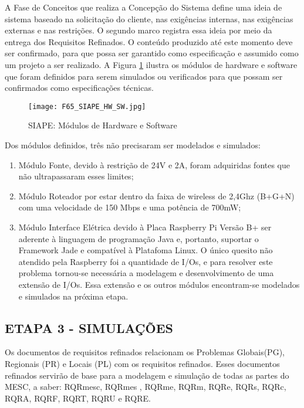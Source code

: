 A Fase de Conceitos que realiza a Concepção do Sistema define uma ideia de sistema baseado na solicitação do cliente,  nas exigências internas, nas exigências externas e nas restrições. O segundo marco registra essa ideia por meio da entrega dos Requisitos Refinados. O conteúdo produzido até este momento deve ser confirmado, para que possa ser garantido como especificação e assumido como um projeto a ser realizado.  A Figura \ref{F65} ilustra os módulos de hardware e software que foram definidos para serem simulados ou verificados para que possam ser confirmados como especificações técnicas. \par 

\begin{figure}[h]
	\centering
	\texttt{[image: F65\_SIAPE\_HW\_SW.jpg]} 
	\caption{SIAPE: Módulos de Hardware e Software}
	\label{F65}
\end{figure}

Dos módulos definidos, três não precisaram ser modelados e simulados:

\begin{enumerate}
	\item Módulo Fonte, devido à restrição de 24V e 2A, foram adquiridas fontes que não ultrapassaram esses limites;
	\item Módulo Roteador por estar dentro da faixa de wireless de 2,4Ghz (B+G+N) com uma velocidade de 150 Mbps e uma potência de 700mW;
	\item Módulo Interface Elétrica devido à Placa Raspberry Pi Versão B+ ser aderente à linguagem de programação Java e, portanto, suportar o Framework Jade e compatível à Platafoma Linux. O único quesito não atendido pela Raspberry foi a quantidade de I/Os, e para resolver este problema tornou-se necessária a modelagem e desenvolvimento de uma extensão de I/Os. Essa extensão e os outros módulos encontram-se modelados e simulados na próxima etapa.\par 
\end{enumerate}


\newpage


\subsection{ETAPA 3 - SIMULAÇÕES}
 
Os documentos de requisitos refinados relacionam os Problemas Globais(PG), Regionais (PR) e Locais (PL) com os requisitos refinados. Esses documentos refinados servirão de base para a modelagem e simulação de todas as partes do MESC, a saber: RQRmesc, RQRmes , RQRme, RQRm, RQRe, RQRs, RQRc, RQRA, RQRF, RQRT, RQRU e RQRE. %
 	 
